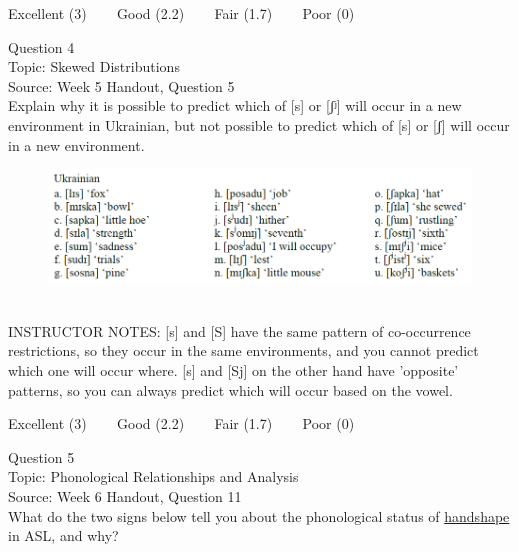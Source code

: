 \documentclass[12pt]{article}
\begin{document}
\vfill
Excellent (3) ~~~ Good (2.2) ~~~ Fair (1.7) ~~~ Poor (0)
\newpage

{\large Question 4}\\

Topic: Skewed Distributions\\
Source: Week 5 Handout, Question 5\\

Explain why it is possible to predict which of [s] or [ʃʲ] will occur in a new environment in Ukrainian, but not possible to predict which of [s] or [ʃ] will occur in a new environment.\\

\begin{figure}[H]
\includegraphics{../images/ukrainian.png}
\end{figure}

~\\
INSTRUCTOR NOTES: [s] and [S] have the same pattern of co-occurrence restrictions, so they occur in the same environments, and you cannot predict which one will occur where. [s] and [Sj] on the other hand have 'opposite' patterns, so you can always predict which will occur based on the vowel.


\vfill
Excellent (3) ~~~ Good (2.2) ~~~ Fair (1.7) ~~~ Poor (0)
\newpage

{\large Question 5}\\

Topic: Phonological Relationships and Analysis\\
Source: Week 6 Handout, Question 11\\

What do the two signs below tell you about the phonological status of \underline{handshape} in ASL, and why?\\
\end{document}
